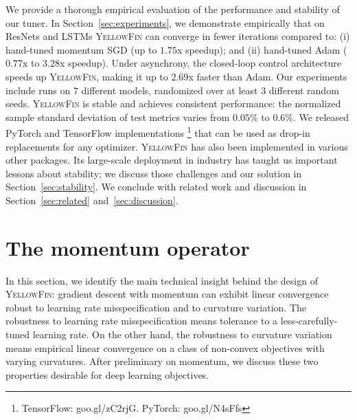 \documentclass{article}
\newcommand{\tuner}{\textsc{YellowFin}\xspace}
\newcommand{\yell}[1]{#1}
\begin{document}
We provide a thorough empirical evaluation of the performance and stability of our tuner.
In Section~\ref{sec:experiments}, we demonstrate empirically that \yell{on ResNets and LSTMs}
\tuner can converge in fewer iterations compared to:
(i) hand-tuned momentum SGD (up to $1.75$x speedup);
and (ii) hand-tuned Adam ($0.77$x to $3.28$x speedup).
Under asynchrony, the closed-loop control architecture speeds up \tuner, 
making it up to $2.69$x faster than Adam. 
Our experiments include runs on $7$ different models, randomized over at least $3$ different random seeds. 
\tuner is stable and achieves consistent performance: the normalized sample standard deviation of test metrics varies from $0.05\%$ to $0.6\%$.
We released PyTorch and TensorFlow implementations
\footnote{TensorFlow: goo.gl/zC2rjG.  PyTorch: goo.gl/N4sFfs}%
that can be used as drop-in replacements for any optimizer.
\tuner has also been implemented in various other packages.
Its large-scale deployment in industry has taught us important lessons about stability; we discuss those challenges and our solution in Section~\ref{sec:stability}.
We conclude with related work and discussion in Section~\ref{sec:related} and~\ref{sec:discussion}.


\vspace{-0.1em}
\section{The momentum operator}
\label{sec:momentum_operator}

\newcommand{\gc}{generalized curvature\xspace}
\newcommand{\Gc}{Generalized curvature\xspace}
\vspace{-0.15em}
In this section, we identify the main technical insight behind the design of \tuner:
 gradient descent with momentum can exhibit linear convergence robust to learning rate misspecification and to curvature variation.
The robustness to learning rate misspecification means tolerance to a less-carefully-tuned learning rate.
On the other hand, the robustness to curvature variation means empirical linear convergence on a class of non-convex objectives with varying curvatures.
After preliminary on momentum, 
we discuss these two properties desirable for deep learning objectives.
\end{document}
